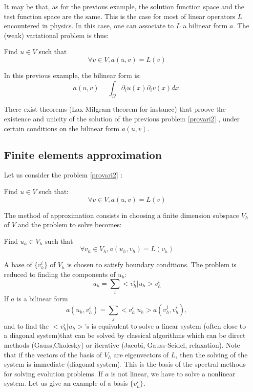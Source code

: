 \documentclass[12pt]{book}
\begin{document}
It may be that, as for the previous example, the solution function
space and the test 
function space are the same. This is the case for most of linear operators $L$
encountered in physics. In this case, one can associate to $L$ a bilinear form
$a$. The (weak) variational problem is thus:
\begin{prob}\label{provari2} 
Find $u\in V$ such that 
\begin{equation}
\forall v\in V, a(u,v)=L(v)
\end{equation}
\end{prob}
\begin{exmp}
In this previous example, the bilinear form is:
\begin{equation}
a(u,v)=\int_\Omega \partial_i u(x)\partial_i v(x) dx.
\end{equation}

\end{exmp}
There exist theorems (Lax-Milgram theorem for instance) that proove the
existence and unicity of the solution of the previous problem
\ref{provari2} , under certain 
conditions on the bilinear form $a(u,v)$.

\subsection{Finite elements approximation}\label{secvarinum}

Let us consider the problem \ref{provari2} :
\begin{prob}
Find $u\in V$ such that: 
\begin{equation}
\forall v\in V, a(u,v)=L(v)
\end{equation}
\end{prob}
The method of approximation consists in choosing a finite dimension subspace
$V_h$ of $V$ and the problem to solve becomes:
\begin{prob}\label{provari3} 
Find $u_h\in V_h$ such that 
\begin{equation}
\forall v_h\in V_h, a(u_h,v_h)=L(v_h)
\end{equation}
\end{prob}
A base of $\{v_h^i\}$ of $V_h$ is chosen to satisfy boundary conditions.
The problem is reduced to finding the components of $u_h$:
\begin{equation}
u_h=\sum_i<v_h^i|u_h>v_h^i
\end{equation}
If $a$ is a bilinear form
\begin{equation}
a(u_h,v_h^i)=\sum_j<v_h^i|u_h>a(v_h^j,v_h^i),
\end{equation}
and to find the $<v_h^i|u_h>$'s is equivalent to solve a linear system (often
close to a diagonal system)that can be solved by classical algorithms 
\cite{ma:equad:Ciarlet88,ma:compu:Press92}
which can be direct methods 
(Gauss,Cholesky) or iterative (Jacobi, Gauss-Seidel,
relaxation). Note that if the vectors of the basis of $V_h$ are eigenvectors
of $L$, then the solving of the system is immediate (diagonal system). This is
the basis of the spectral methods for solving evolution problems. If $a$ is
not linear, we have to solve a 
nonlinear system. Let us give an example of a basis $\{v_h^i\}$.
\end{document}
